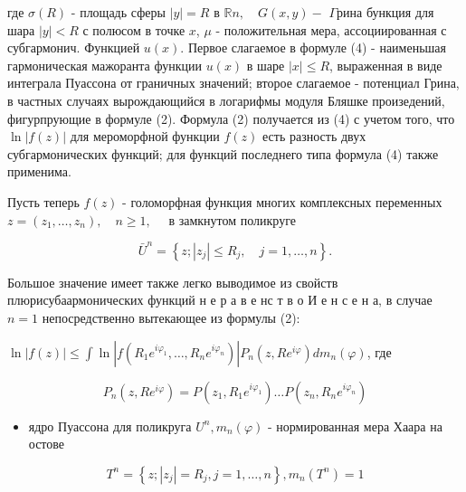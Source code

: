 \documentclass[10pt]{article}
\begin{document}
где $\sigma(R)$ - площадь сферы $|y|=R$ в $\mathbb{R} n, \quad G(x, y)-$ $\Gamma р и н а$ бункция для шара $|y|<R$ с полюсом в точке $x$, $\mu$ - положительная мера, ассоциированная с субгармонич. Функцией $u(x)$. Первое слагаемое в формуле (4) - наименьшая гармоническая мажоранта функции $u(x)$ в шаре $|x| \leqslant R$, выраженная в виде интеграла Пуассона от граничных значений; второе слагаемое - потенциал Грина, в частных случаях вырождающийся в логарифмы модуля Бляшке произедений, фигурпрующие в формуле (2). Формула (2) получается из (4) с учетом того, что $\ln |f(z)|$ для мероморфной функции $f(z)$ есть разность двух субгармонических функций; для функций последнего типа формула (4) также применима.



Пусть теперь $f(z)$ - голоморфная функция многих комплексных переменных $z=\left(z_{1}, \ldots, z_{n}\right), \quad n \geqslant 1, \quad$ в замкнутом поликруге



\[

\bar{U}^{n}=\left\{z ;\left|z_{j}\right| \leqslant R_{j}, \quad j=1, \ldots, n\right\} .

\]



Большое значение имеет также легко выводимое из свойств плюрисубаармонических функций н е р а в е нс т в о И е н с е н а, в случае $n=1$ непосредственно вытекающее из формулы (2):



$\ln |f(z)| \leqslant \int \ln \left|f\left(R_{1} e^{i \varphi_{1}}, \ldots, R_{n} e^{i \varphi_{n}}\right)\right| P_{n}\left(z, R e^{i \varphi}\right) d m_{n}(\varphi)$, где



\[

P_{n}\left(z, R e^{i \varphi}\right)=P\left(z_{1}, R_{1} e^{i \varphi_{1}}\right) \ldots P\left(z_{n}, R_{n} e^{i \varphi_{n}}\right)

\]



\begin{itemize}

  \item ядро Пуассона для поликруга $U^{n}, m_{n}(\varphi)$ - нормированная мера Хаара на остове

\end{itemize}



\[

T^{n}=\left\{z ;\left|z_{j}\right|=R_{j}, j=1, \ldots, n\right\}, m_{n}\left(T^{n}\right)=1

\]
\end{document}
